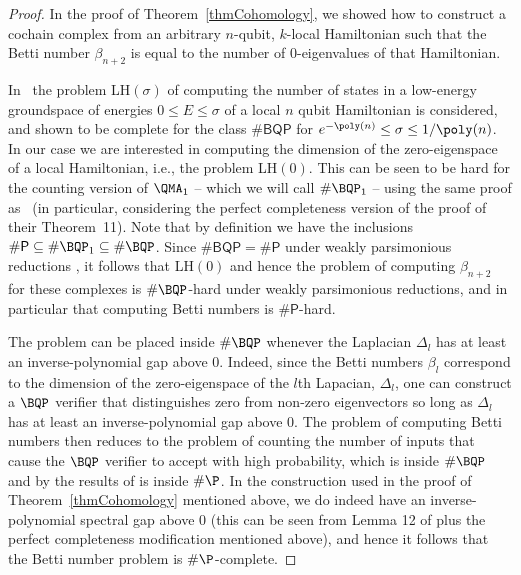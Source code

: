 \documentclass[11pt]{article}
\numberwithin{equation}{section}
\renewcommand\( {\left(}
\renewcommand\) {\right)}
\newcommand{\sharpP}{\mathsf{\#P}}
\begin{document}
\begin{proof}
   
    In the proof of Theorem~\ref{thmCohomology}, we showed how to construct a cochain complex from an arbitrary $n$-qubit, $k$-local Hamiltonian such that the Betti number $\beta_{n+2}$ is equal to the number of $0$-eigenvalues of that Hamiltonian. 
    

   
    In~\cite{Brown_2011} the problem {\sc LH$(\sigma)$} of computing the number of states in a low-energy groundspace of energies $0\leq E\leq \sigma$ of a local $n$ qubit Hamiltonian is considered, and shown to be complete for the class $\mathsf{\#BQP}$ for $e^{-\poly(n)}\leq \sigma\leq 1/\poly(n)$. In our case we are interested in computing the dimension of the zero-eigenspace of a local Hamiltonian, i.e., the problem {\sc LH$(0)$}. This can be seen to be hard for the counting version of $\QMA_1$ -- which we will call $\#\BQP_1$ -- using the same proof as~\cite{Brown_2011} (in particular, considering the perfect completeness version of the  proof of their Theorem~11). Note that by definition we have the inclusions $\sharpP \subseteq \#\BQP_1 \subseteq \#\BQP$. Since $\mathsf{\#BQP}=\sharpP$ under weakly parsimonious reductions  \cite{Brown_2011}, it follows that {\sc LH$(0)$} and hence the problem of computing $\beta_{n+2}$ for these complexes is  $\#\BQP$-hard under weakly parsimonious reductions, and in particular that computing Betti numbers is $\sharpP$-hard.

The problem can be placed inside $\#\BQP$ whenever the Laplacian $\Delta_l$  has at least an inverse-polynomial gap above 0. Indeed, since the Betti numbers $\beta_l$ correspond to the dimension of the zero-eigenspace of the $l$th Lapacian, $\Delta_l$, one can construct a $\BQP$ verifier that distinguishes zero from non-zero eigenvectors so long as  $\Delta_l$ has at least an inverse-polynomial gap above 0. The problem of computing Betti numbers then reduces to the problem of counting the number of inputs that cause the $\BQP$ verifier to accept with high probability, which is inside $\#\BQP$ and by the results of \cite{Brown_2011} is inside $\#\P$. In the construction used in the proof of Theorem~\ref{thmCohomology} mentioned above, we do indeed have an inverse-polynomial spectral gap above 0 (this can be seen from Lemma 12 of \cite{Brown_2011} plus the perfect completeness modification mentioned above), and hence it follows that the Betti number problem is $\#\P$-complete. 
\end{proof}
\end{document}
